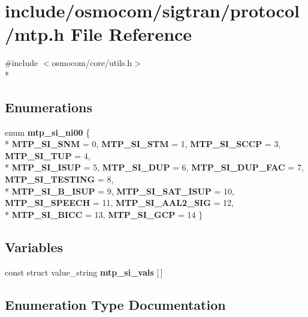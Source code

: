 \section{include/osmocom/sigtran/protocol/mtp.h File Reference}
\label{mtp_8h}
{\ttfamily \#include $<$osmocom/core/utils.\+h$>$}\\*
\subsection*{Enumerations}
\begin{DoxyCompactItemize}
\item 
enum {\bf mtp\+\_\+si\+\_\+ni00} \{ \\*
{\bf M\+T\+P\+\_\+\+S\+I\+\_\+\+S\+NM} = 0, 
{\bf M\+T\+P\+\_\+\+S\+I\+\_\+\+S\+TM} = 1, 
{\bf M\+T\+P\+\_\+\+S\+I\+\_\+\+S\+C\+CP} = 3, 
{\bf M\+T\+P\+\_\+\+S\+I\+\_\+\+T\+UP} = 4, 
\\*
{\bf M\+T\+P\+\_\+\+S\+I\+\_\+\+I\+S\+UP} = 5, 
{\bf M\+T\+P\+\_\+\+S\+I\+\_\+\+D\+UP} = 6, 
{\bf M\+T\+P\+\_\+\+S\+I\+\_\+\+D\+U\+P\+\_\+\+F\+AC} = 7, 
{\bf M\+T\+P\+\_\+\+S\+I\+\_\+\+T\+E\+S\+T\+I\+NG} = 8, 
\\*
{\bf M\+T\+P\+\_\+\+S\+I\+\_\+\+B\+\_\+\+I\+S\+UP} = 9, 
{\bf M\+T\+P\+\_\+\+S\+I\+\_\+\+S\+A\+T\+\_\+\+I\+S\+UP} = 10, 
{\bf M\+T\+P\+\_\+\+S\+I\+\_\+\+S\+P\+E\+E\+CH} = 11, 
{\bf M\+T\+P\+\_\+\+S\+I\+\_\+\+A\+A\+L2\+\_\+\+S\+IG} = 12, 
\\*
{\bf M\+T\+P\+\_\+\+S\+I\+\_\+\+B\+I\+CC} = 13, 
{\bf M\+T\+P\+\_\+\+S\+I\+\_\+\+G\+CP} = 14
 \}
\end{DoxyCompactItemize}
\subsection*{Variables}
\begin{DoxyCompactItemize}
\item 
const struct value\+\_\+string {\bf mtp\+\_\+si\+\_\+vals} [$\,$]
\end{DoxyCompactItemize}


\subsection{Enumeration Type Documentation}
